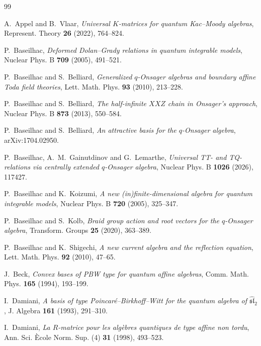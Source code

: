 \documentclass[11pt]{extarticle}
\theoremstyle{definition}
\theoremstyle{remark}
\numberwithin{equation}{section}
\begin{document}
\begin{thebibliography}{99}

A.~Appel and B.~Vlaar,
\emph{Universal $K$-matrices for quantum Kac--Moody algebras},
Represent. Theory \textbf{26} (2022), 764--824.

P.~Baseilhac,
\emph{Deformed Dolan--Grady relations in quantum integrable models},
Nuclear Phys. B \textbf{709} (2005), 491--521.

P.~Baseilhac and S.~Belliard,
\emph{Generalized $q$-Onsager algebras and boundary affine Toda field theories},
Lett. Math. Phys. \textbf{93} (2010), 213--228.

P.~Baseilhac and S.~Belliard,
\emph{The half-infinite $XXZ$ chain in Onsager's approach},
Nuclear Phys. B \textbf{873} (2013), 550--584.

P.~Baseilhac and S.~Belliard,
\emph{An attractive basis for the $q$-Onsager algebra},
arXiv:1704.02950.

P.~Baseilhac, A.~M.~Gainutdinov and G.~Lemarthe,
\emph{Universal TT- and TQ-relations via centrally extended $q$-Onsager algebra},
Nuclear Phys. B \textbf{1026} (2026), 117427.

P.~Baseilhac and K.~Koizumi,
\emph{A new (in)finite-dimensional algebra for quantum integrable models},
Nuclear Phys. B \textbf{720} (2005), 325--347.

P.~Baseilhac and S.~Kolb,
\emph{Braid group action and root vectors for the $q$-Onsager algebra},
Transform. Groups \textbf{25} (2020), 363--389.

P.~Baseilhac and K.~Shigechi,
\emph{A new current algebra and the reflection equation},
Lett. Math. Phys. \textbf{92} (2010), 47--65.

J.~Beck,
\emph{Convex bases of PBW type for quantum affine algebras},
Comm. Math. Phys. \textbf{165} (1994), 193--199.

I.~Damiani,
\emph{A basis of type Poincar\'e--Birkhoff--Witt for the quantum algebra of
$\widehat{\mathfrak{sl}}_2$},
J. Algebra \textbf{161} (1993), 291--310.

I.~Damiani,
\emph{La $R$-matrice pour les alg\`ebres quantiques de type affine non tordu},
Ann. Sci. \`Ecole Norm. Sup. (4) \textbf{31} (1998), 493--523.


\end{thebibliography}
\end{document}
